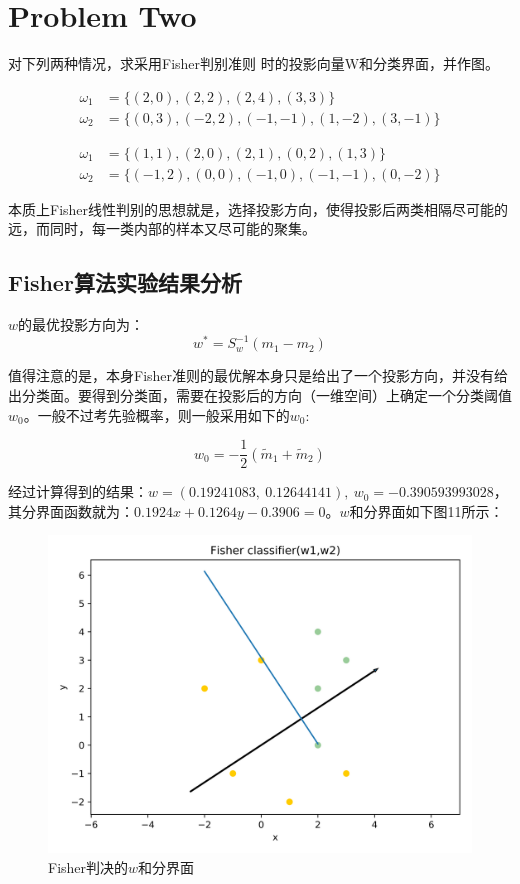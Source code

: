 \documentclass{article}
\newcommand{\hs}{\hspace{2em}}
\begin{document}
\section{Problem Two}
{}

\hs 对下列两种情况，求采用Fisher判别准则 时的投影向量W和分类界面，并作图。

\begin{align*}
\omega_1 &= \{(2,0)  ,(2,2)  ,(2,4) ,(3,3)\}\\
\omega_2 &= \{(0, 3), (-2, 2), (-1, -1), (1, -2), (3, -1)\}
\end{align*}

\begin{align*}
\omega_1 &= \{(1, 1), (2, 0), (2, 1), (0, 2), (1, 3)\}\\
\omega_2 &= \{(-1, 2), (0, 0), (-1, 0), (-1, -1), (0, -2)\}
\end{align*}

\hs 本质上Fisher线性判别的思想就是，选择投影方向，使得投影后两类相隔尽可能的远，而同时，每一类内部的样本又尽可能的聚集。

\subsection{Fisher算法实验结果分析}
{}

\hs $w$的最优投影方向为：
\begin{equation*}
w^* = S_w^{-1}(m_1-m_2)
\end{equation*}

值得注意的是，本身Fisher准则的最优解本身只是给出了一个投影方向，并没有给出分类面。要得到分类面，需要在投影后的方向（一维空间）上确定一个分类阈值$w_0$。一般不过考先验概率，则一般采用如下的$w_0$:

\begin{equation*}
w_0 = -\frac{1}{2}(\widetilde{m}_1+\widetilde{m}_2)
\end{equation*}

{}

\hs 经过计算得到的结果：$w=(0.19241083,~0.12644141),~w_0=-0.390593993028$，其分界面函数就为：$0.1924x+0.1264y-0.3906=0$。$w$和分界面如下图11所示：
\begin{figure}[htbp]
	\centering
	\includegraphics[width=0.6\linewidth]{img//fig12}
	\caption{Fisher判决的$w$和分界面}
\end{figure}
\end{document}
